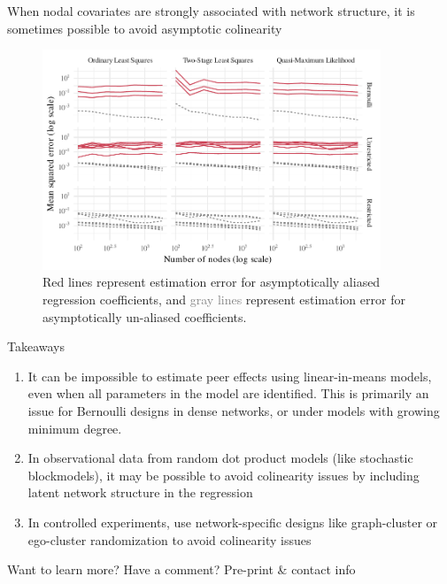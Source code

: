 \documentclass[final]{beamer}
\newlength{\colwidth}
\begin{document}
\begin{frame}[t]
\begin{columns}[t]
\begin{column}{\colwidth}
\begin{block}{When nodal covariates are strongly associated with network structure, it is sometimes possible to avoid asymptotic colinearity}
                \begin{figure}
                    \centering
                    \includegraphics[width=0.9\textwidth]{./figures/simulations/biometrika-mse-all.pdf}
                    \caption{\textcolor{Mahogany}{Red lines} represent estimation error for asymptotically aliased regression coefficients, and \textcolor{gray}{gray lines} represent estimation error for asymptotically un-aliased coefficients.}
                \end{figure}

            \end{block}

            \begin{block}{Takeaways}
                \begin{enumerate}
                    \item It can be impossible to estimate peer effects using linear-in-means models, even when all parameters in the model are identified. This is primarily an issue for Bernoulli designs in dense networks, or under models with growing minimum degree.
                    \item In observational data from random dot product models (like stochastic blockmodels), it may be possible to avoid colinearity issues by including latent network structure in the regression
                    \item In controlled experiments, use network-specific designs like graph-cluster or ego-cluster randomization to avoid colinearity issues
                \end{enumerate}
            \end{block}

            \begin{block}{Want to learn more? Have a comment? Pre-print \& contact info}
                \nocite{hayes2024c}
                \printbibliography



\end{block}
\end{column}
\end{columns}
\end{frame}
\end{document}
